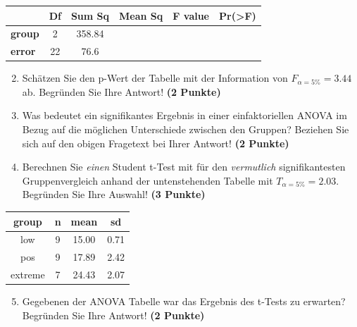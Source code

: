 \documentclass[a4paper, 9pt]{scrartcl}\usepackage[]{graphicx}\usepackage[]{xcolor}
\newenvironment{knitrout}{}{} %
\begin{document}
\vspace{1Ex}

\begin{center}
  \Large
  \begin{tabular}{l|c|c|c|c|c}
     & \textbf{Df} & \textbf{Sum Sq} & \textbf{Mean Sq} & \textbf{F value} & \textbf{Pr(>F)} \strut\\
    \hline
   \textbf{group}  & 2 & 358.84 &  &  &  \strut\\
    \hline
   \textbf{error}  & 22 & 76.6 &  &  &  \strut\\
  \end{tabular}
\end{center}

\vspace{1Ex}

\begin{enumerate}
  \setcounter{enumi}{1}
\item Sch{\"a}tzen Sie den p-Wert der Tabelle mit der Information von
  $F_{\alpha = 5\%} = 3.44$ ab. Begr{\"u}nden Sie Ihre
  Antwort! \textbf{(2 Punkte)}
\item Was bedeutet ein signifikantes Ergebnis in einer einfaktoriellen
  ANOVA im Bezug auf die m{\"o}glichen Unterschiede zwischen den Gruppen?
  Beziehen Sie sich auf den obigen Fragetext bei Ihrer Antwort!  \textbf{(2
    Punkte)}
\item Berechnen Sie \textit{einen} Student t-Test mit f{\"u}r den \textit{vermutlich}
  signifikantesten Gruppenvergleich anhand der untenstehenden Tabelle mit
  $T_{\alpha = 5\%} = 2.03$. Begr{\"u}nden Sie Ihre Auswahl! \textbf{(3 Punkte)}
\end{enumerate}

\begin{knitrout}
\color{fgcolor}\begin{table}[!h]
\centering
\begin{tabular}{cccc}
\toprule
group & n & mean & sd\\
\midrule
low & 9 & 15.00 & 0.71\\
pos & 9 & 17.89 & 2.42\\
extreme & 7 & 24.43 & 2.07\\
\bottomrule
\end{tabular}
\end{table}

\end{knitrout}

\begin{enumerate}
  \setcounter{enumi}{4}
\item Gegebenen der ANOVA Tabelle war das Ergebnis des t-Tests zu erwarten?
  Begr{\"u}nden Sie Ihre Antwort! \textbf{(2 Punkte)}
\end{enumerate}
\end{document}
